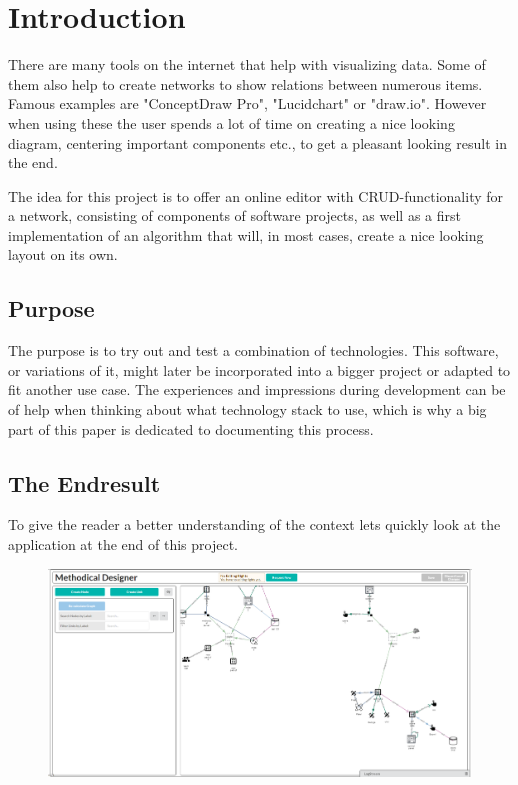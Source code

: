 \chapter{Introduction}
\label{chap:Intro}
There are many tools on the internet that help with visualizing data. Some of them also help to create networks to show relations between numerous items. Famous examples are "ConceptDraw Pro", "Lucidchart" \cite{JeffParker} or "draw.io". However when using these the user spends a lot of time on creating a nice looking diagram, centering important components etc., to get a pleasant looking result in the end.

The idea for this project is to offer an online editor with CRUD-functionality for a network, consisting of components of software projects, as well as a first implementation of an algorithm that will, in most cases, create a nice looking layout on its own.

\section{Purpose}
The purpose is to try out and test a combination of technologies. This software, or variations of it, might later be incorporated into a bigger project or adapted to fit another use case. The experiences and impressions during development can be of help when thinking about what technology stack to use, which is why a big part of this paper is dedicated to documenting this process.

\section{The Endresult}
To give the reader a better understanding of the context lets quickly look at the application at the end of this project.
\begin{figure}[H]
\centering
\includegraphics[scale=.35]{Bilder/AppOverview.png}
\label{pic:AppOverview}
\end{figure}


